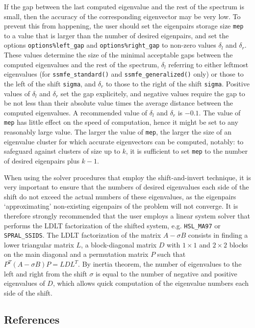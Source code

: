 If the gap %
between the last computed eigenvalue 
and the rest of the spectrum is small,
then the accuracy of the corresponding eigenvector may be very low.
To prevent this from happening,
the user should set the eigenpairs storage size {\tt mep}
to a value that is larger than the number of desired eigenpairs,
and set the options 
{\tt options\%left\_gap}
and
{\tt options\%right\_gap}
to non-zero values $\delta_l$ and $\delta_r$.
These values
determine the size of the minimal acceptable gaps
between the computed eigenvalues and the rest of the spectrum,
$\delta_l$ referring to either leftmost eigenvalues
(for {\tt ssmfe\_standard()} and {\tt ssmfe\_generalized()} only)
or those to the left of the shift {\tt sigma},
and $\delta_r$
to those to the right of the shift {\tt sigma}.
Positive values of $\delta_l$ and $\delta_r$
set the gap explicitely,
and negative values
require the gap to be not less than their absolute value times
the average distance between the computed eigenvalues.
A recommended value of $\delta_l$ and $\delta_r$ is $-0.1$.
The value of {\tt mep} %
has little effect on
the speed of computation,
hence it might be set to any reasonably large value.
The larger the value of {\tt mep}, 
the larger the size of an eigenvalue cluster
for which accurate eigenvectors can be computed, notably:
to safeguard against clusters of size up to $k$,
it is sufficient to set {\tt mep} to the number of desired eigenpairs
plus $k - 1$.

When using the solver procedures that employ the shift-and-invert technique,
it is very important to ensure that the numbers of desired eigenvalues
each side of the shift do not exceed the actual numbers of these eigenvalues,
as the eigenpairs `approximating' non-existing eigenpairs of the problem
will not converge.
It is therefore strongly recommended that the user employs 
a linear system solver that performs
the LDLT
factorization of %
the shifted system,
e.g. {\tt HSL\_MA97} or {\tt SPRAL\_SSIDS}.
The LDLT factorization of the matrix
$A - \sigma B$ consists in finding a lower triangular
matrix $L$, a block-diagonal matrix $D$
with $1\times 1$ and $2\times 2$ blocks on the main diagonal
and a permutation matrix $P$
such that $P^T(A - \sigma B)P = L D L^T$.
By inertia theorem,
the number of eigenvalues to the left and right from 
the shift $\sigma$
is equal to the number of negative and positive eigenvalues of $D$,
which allows quick computation of the eigenvalue numbers
each side of the shift.

\subsection*{References}

